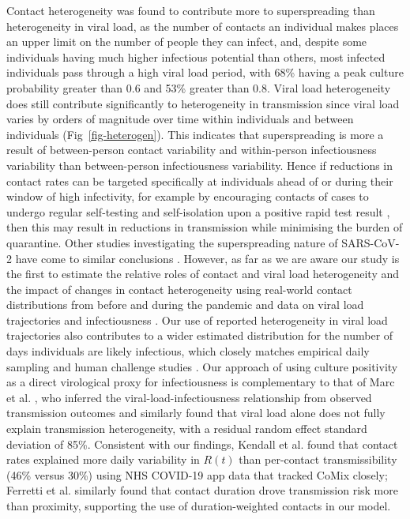 \documentclass[
  10pt,
  letterpaper,
]{article}
\begin{document}
Contact heterogeneity was found to contribute more to superspreading
than heterogeneity in viral load, as the number of contacts an
individual makes places an upper limit on the number of people they can
infect, and, despite some individuals having much higher infectious
potential than others, most infected individuals pass through a high
viral load period, with 68\% having a peak culture probability greater
than 0.6 and 53\% greater than 0.8. Viral load heterogeneity does still
contribute significantly to heterogeneity in transmission since viral
load varies by orders of magnitude over time within individuals and
between individuals (Fig~\ref{fig-heterogen}). This indicates that
superspreading is more a result of between-person contact variability
and within-person infectiousness variability than between-person
infectiousness variability. Hence if reductions in contact rates can be
targeted specifically at individuals ahead of or during their window of
high infectivity, for example by encouraging contacts of cases to
undergo regular self-testing and self-isolation upon a positive rapid
test result \citep{quilty2021}, then this may result in reductions in
transmission while minimising the burden of quarantine. Other studies
investigating the superspreading nature of SARS-CoV-2 have come to
similar conclusions
\citep{susswein2020, ke2022, goyal2021, sun2021, ke2021pnas, hart2023}.
However, as far as we are aware our study is the first to estimate the
relative roles of contact and viral load heterogeneity and the impact of
changes in contact heterogeneity using real-world contact distributions
from before and during the pandemic and data on viral load trajectories
and infectiousness \citep{pickering2021}. Our use of reported
heterogeneity in viral load trajectories \citep{kissler2021} also
contributes to a wider estimated distribution for the number of days
individuals are likely infectious, which closely matches empirical daily
sampling \citep{ke2022} and human challenge studies
\citep{killingley2022}. Our approach of using culture positivity as a
direct virological proxy for infectiousness is complementary to that of
Marc et al. \citep{marc2021}, who inferred the viral-load-infectiousness
relationship from observed transmission outcomes and similarly found
that viral load alone does not fully explain transmission heterogeneity,
with a residual random effect standard deviation of 85\%. Consistent
with our findings, Kendall et al. \citep{kendall2024} found that contact
rates explained more daily variability in \(R(t)\) than per-contact
transmissibility (46\% versus 30\%) using NHS COVID-19 app data that
tracked CoMix closely; Ferretti et al. \citep{ferretti2024} similarly
found that contact duration drove transmission risk more than proximity,
supporting the use of duration-weighted contacts in our model.
\end{document}
